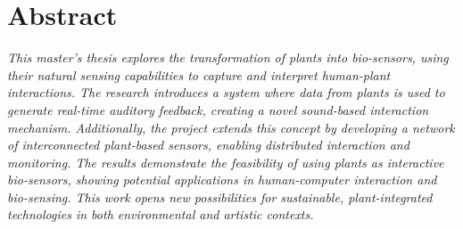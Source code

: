 \section*{Abstract}


\textit{This master's thesis explores the transformation of plants into bio-sensors, using their natural sensing capabilities to capture and interpret human-plant interactions. The research introduces a system where data from plants is used to generate real-time auditory feedback, creating a novel sound-based interaction mechanism. Additionally, the project extends this concept by developing a network of interconnected plant-based sensors, enabling distributed interaction and monitoring. The results demonstrate the feasibility of using plants as interactive bio-sensors, showing potential applications in human-computer interaction and bio-sensing. This work opens new possibilities for sustainable, plant-integrated technologies in both environmental and artistic contexts.}